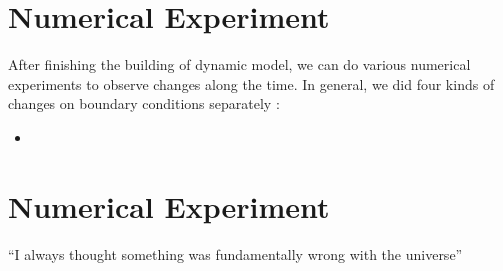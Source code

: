 \documentclass{article}
\begin{document}
\section{Numerical Experiment}
After finishing the building of dynamic model, we can do various numerical experiments to observe changes along the time. In general, we did four kinds of changes on boundary conditions separately :
\begin{itemize}
	\item 
\end{itemize}

\section{Numerical Experiment}
``I always thought something was fundamentally wrong with the universe'' \citep{adams1995hitchhiker}



\end{document}
